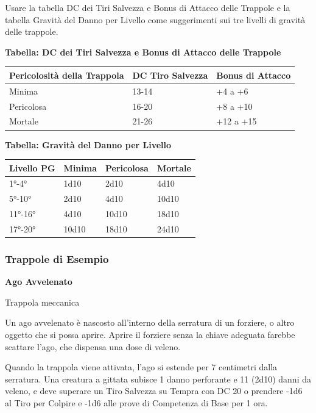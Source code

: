 \begin{multicols}{2}
Usare la tabella DC dei Tiri Salvezza e Bonus di Attacco delle Trappole e la tabella Gravità del Danno per Livello come suggerimenti sui tre livelli di gravità delle trappole.

\medskip

\textbf{Tabella: DC dei Tiri Salvezza e Bonus di Attacco delle Trappole}

\medskip

\noindent\begin{tabularx}{\linewidth}{X|X|X}
	\toprule
\rowcolor{gray!20}Pericolosità della Trappola&DC Tiro Salvezza& Bonus di Attacco\\
\toprule
Minima&13-14&+4 a +6\\
\rowcolor{gray!20}Pericolosa&16-20&+8 a +10\\
Mortale&21-26&+12 a +15
\end{tabularx}

\medskip

\textbf{Tabella: Gravità del Danno per Livello}

\medskip

\noindent\begin{tabularx}{\linewidth}{X|X|X|X}
	\toprule
\rowcolor{gray!20}Livello PG&Minima&Pericolosa&Mortale\\
\toprule
1°-4°&1d10&2d10&4d10\\
\rowcolor{gray!20}5°-10°&2d10&4d10&10d10\\
11°-16°&4d10&10d10&18d10\\
\rowcolor{gray!20}17°-20°&10d10&18d10&24d10
\end{tabularx}

\medskip

\subsubsection{Trappole di Esempio}\hypertarget{trappoleesempio}{}\label{trappoleesempio}
\textbf{Ago Avvelenato}

Trappola meccanica

Un ago avvelenato è nascosto all'interno della serratura di un forziere, o altro oggetto che si possa aprire. Aprire il forziere senza la chiave adeguata farebbe scattare l'ago, che dispensa una dose di veleno.

Quando la trappola viene attivata, l'ago si estende per 7 centimetri dalla serratura. Una creatura a gittata subisce 1 danno perforante e 11 (2d10) danni da veleno, e deve superare un Tiro Salvezza su Tempra con DC 20 o prendere -1d6 al Tiro per Colpire e -1d6 alle prove di Competenza di Base per 1 ora.


\end{multicols}
